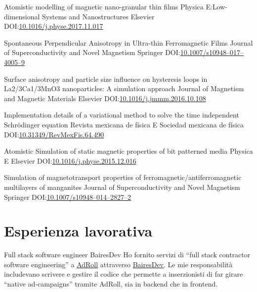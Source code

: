\documentclass[12pt,english]{moderncv}
\begin{document}
        {Atomistic modelling of magnetic nano-granular thin films}
        {Physica E:\@ Low-dimensional Systems and Nanostructures}
        {Elsevier}
        {}
        {DOI:\@ \href{https://doi.org/10.1016/j.physe.2017.11.017}{10.1016/j.physe.2017.11.017}}

        {%
            Spontaneous Perpendicular Anisotropy in Ultra-thin Ferromagnetic
            Films%
        }
        {Journal of Superconductivity and Novel Magnetism}
        {Springer}
        {}
        {DOI:\@ \href{https://doi.org/10.1007/s10948-017-4005-9}{10.1007/s10948--017--4005--9}}

        {%
            Surface anisotropy and particle size influence on hysteresis loops
            in La2/3Ca1/3MnO3 nanoparticles: A simulation approach%
        }
        {Journal of Magnetism and Magnetic Materials}
        {Elsevier}
        {}
        {DOI:\@ \href{https://doi.org/10.1016/j.jmmm.2016.10.108}{10.1016/j.jmmm.2016.10.108}}

        {%
            Implementation details of a variational method to solve the time
            independent Schrödinger equation%
        }
        {Revista mexicana de física E}
        {Sociedad mexicana de física}
        {}
        {DOI:\@ \href{https://doi.org/10.31349/RevMexFis.64.490}{10.31349/RevMexFis.64.490}}

        {Atomistic Simulation of static magnetic properties of bit patterned media}
        {Physica E}
        {Elsevier}
        {}
        {DOI:\@ \href{https://doi.org/10.1016/j.physe.2015.12.016}{10.1016/j.physe.2015.12.016}}

        {%
            Simulation of magnetotransport properties of
            ferromagnetic/antiferromagnetic multilayers of manganites%
        }
        {Journal of Superconductivity and Novel Magnetism}
        {Springer}
        {}
        {DOI:\@ \href{https://doi.org/10.1007/s10948-014-2827-2}{10.1007/s10948--014--2827--2}}


\section{Esperienza lavorativa}

        {Full stack software engineer}
        {BairesDev}
        {}
        {}
        {%
            Ho fornito servizi di ``full stack contractor software engineering'' a
            \href{https://www.adroll.com/}{AdRoll} attraverso
            \href{http://www.bairesdev.com/}{BairesDev}.
            Le mie responsabilit\`a includevano scrivere e gestire il codice che permette a inserzionisti di far girare ``native ad-campaigns'' tramite AdRoll, sia in backend che in frontend.
        }
\end{document}
